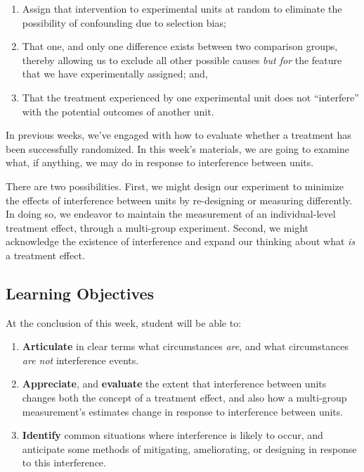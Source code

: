\documentclass[
]{article}
\providecommand{\tightlist}{%
  \setlength{\itemsep}{0pt}\setlength{\parskip}{0pt}}
\begin{document}
\begin{enumerate}
\def\labelenumi{\arabic{enumi}.}
\tightlist
\item
  Assign that intervention to experimental units at random to eliminate the possibility of confounding due to selection bias;
\item
  That one, and only one difference exists between two comparison groups, thereby allowing us to exclude all other possible causes \emph{but for} the feature that we have experimentally assigned; and,
\item
  That the treatment experienced by one experimental unit does not ``interfere'' with the potential outcomes of another unit.
\end{enumerate}

In previous weeks, we've engaged with how to evaluate whether a treatment has been successfully randomized. In this week's materials, we are going to examine what, if anything, we may do in response to interference between units.

There are two possibilities. First, we might design our experiment to minimize the effects of interference between units by re-designing or measuring differently. In doing so, we endeavor to maintain the measurement of an individual-level treatment effect, through a multi-group experiment. Second, we might acknowledge the existence of interference and expand our thinking about what \emph{is} a treatment effect.

\hypertarget{learning-objectives-8}{%
\subsection{Learning Objectives}\label{learning-objectives-8}}

At the conclusion of this week, student will be able to:

\begin{enumerate}
\def\labelenumi{\arabic{enumi}.}
\tightlist
\item
  \textbf{Articulate} in clear terms what circumstances \emph{are}, and what circumstances \emph{are not} interference events.
\item
  \textbf{Appreciate}, and \textbf{evaluate} the extent that interference between units changes both the concept of a treatment effect, and also how a multi-group measurement's estimates change in response to interference between units.
\item
  \textbf{Identify} common situations where interference is likely to occur, and anticipate some methods of mitigating, ameliorating, or designing in response to this interference.
\end{enumerate}
\end{document}
